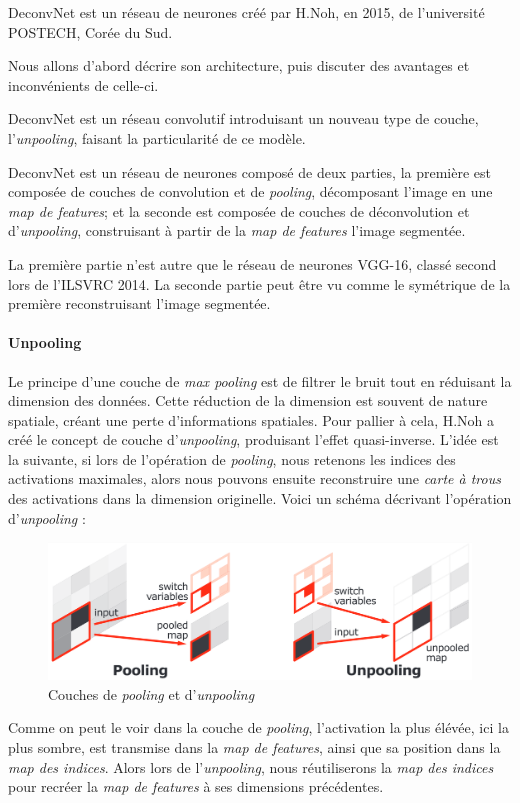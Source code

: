 \documentclass[a4paper, 11pt]{report}
\begin{document}
DeconvNet est un réseau de neurones créé par H.Noh, en 2015, de l'université POSTECH, Corée du Sud.

Nous allons d'abord décrire son architecture, puis discuter des avantages et inconvénients de celle-ci.

DeconvNet est un réseau convolutif introduisant un nouveau type de couche, l'\emph{unpooling}, faisant la particularité de ce modèle.

DeconvNet est un réseau de neurones composé de deux parties, la première est composée de couches de convolution et de \emph{pooling}, décomposant l'image en une \emph{map de features}; et la seconde est composée de couches de déconvolution et d'\emph{unpooling}, construisant à partir de la \emph{map de features} l'image segmentée.

La première partie n'est autre que le réseau de neurones VGG-16, classé second lors de l'ILSVRC 2014.
La seconde partie peut être vu comme le symétrique de la première reconstruisant l'image segmentée.

\paragraph{Unpooling}
Le principe d'une couche de \emph{max pooling} est de filtrer le bruit tout en réduisant la dimension des données. Cette réduction de la dimension est souvent de nature spatiale, créant une perte d'informations spatiales.
Pour pallier à cela, H.Noh a créé le concept de couche d'\emph{unpooling}, produisant l'effet quasi-inverse.
L'idée est la suivante, si lors de l'opération de \emph{pooling}, nous retenons les indices des activations maximales, alors nous pouvons ensuite reconstruire une \emph{carte à trous} des activations dans la dimension originelle.
Voici un schéma décrivant l'opération d'\emph{unpooling} :
\begin{figure}[H]
	\begin{center}
		\includegraphics[scale=0.3]{Images/Unpooling.png}
		\caption{Couches de \emph{pooling} et d'\emph{unpooling}}
	\end{center}
\end{figure}
Comme on peut le voir dans la couche de \emph{pooling}, l'activation la plus élévée, ici la plus sombre, est transmise dans la \emph{map de features}, ainsi que sa position dans la \emph{map des indices}. Alors lors de l'\emph{unpooling}, nous réutiliserons la \emph{map des indices} pour recréer la \emph{map de features} à ses dimensions précédentes.
\end{document}
